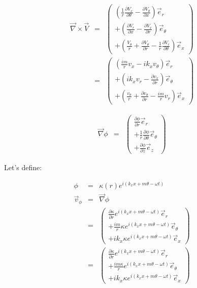 \begin{eqnarray}
\vec{\nabla} \times \vec{V}
&=&
\left(
\begin{array}{r}
\left(
\frac{1}{r}
\frac{\partial V_x}{\partial \theta}
-
\frac{\partial V_{\theta}}{\partial x}
\right) \vec{e}_r
\\
+\left(
\frac{\partial V_r}{\partial x}
-
\frac{\partial V_x}{\partial r}
\right) \vec{e}_{\theta}
\\
+\left(
\frac{V_{\theta}}{r}
+\frac{\partial V_{\theta}}{\partial r}
-
\frac{1}{r}
\frac{\partial V_{r}}{\partial \theta}
\right) \vec{e}_x
\end{array}
\right)
\nonumber
\\
&=&
\left(
\begin{array}{r}
\left(
\frac{i m}{r}
v_x
-
i k_x v_{\theta}
\right) \vec{e}_r
\\
+\left(
i k_x v_r
-
\frac{\partial v_x}{\partial r}
\right) \vec{e}_{\theta}
\\
+\left(
\frac{v_{\theta}}{r}
+\frac{\partial v_{\theta}}{\partial r}
-
\frac{i m}{r}
v_{r}
\right) \vec{e}_x
\end{array}
\right)
\nonumber
\end{eqnarray}

\begin{eqnarray}
\vec{\nabla} \phi
&=&
\left(
\begin{array}{r}
\frac{\partial \phi}{\partial r} \vec{e}_r
\\
+\frac{1}{r} \frac{\partial \phi}{\partial \theta} \vec{e}_{\theta}
\\
+\frac{\partial \phi}{\partial z} \vec{e}_z
\end{array}
\right)
\nonumber
\end{eqnarray}

Let's define:

\begin{eqnarray}
\phi &=& \kappa \left(r \right) e^{i \left(k_x x + m \theta - \omega t \right)}
\nonumber
\\
\vec{v}_{\phi} &=& \vec{\nabla} \phi
\nonumber
\\
&=& 
\left(
\begin{array}{r}
\frac{\partial \kappa}{\partial r} e^{i \left(k_x x + m \theta - \omega t \right)} \vec{e}_r
\\
+\frac{i m}{r} \kappa e^{i \left(k_x x + m \theta - \omega t \right)} \vec{e}_{\theta}
\\
+i k_x \kappa e^{i \left(k_x x + m \theta - \omega t \right)} \vec{e}_x
\end{array}
\right)
\nonumber
\\
&=& 
\left(
\begin{array}{r}
\frac{\partial \kappa}{\partial r} e^{i \left(k_x x + m \theta - \omega t \right)} \vec{e}_r
\\
+\frac{i m \kappa}{r} e^{i \left(k_x x + m \theta - \omega t \right)} \vec{e}_{\theta}
\\
+i k_x \kappa e^{i \left(k_x x + m \theta - \omega t \right)} \vec{e}_x
\end{array}
\right)
\nonumber
\end{eqnarray}

